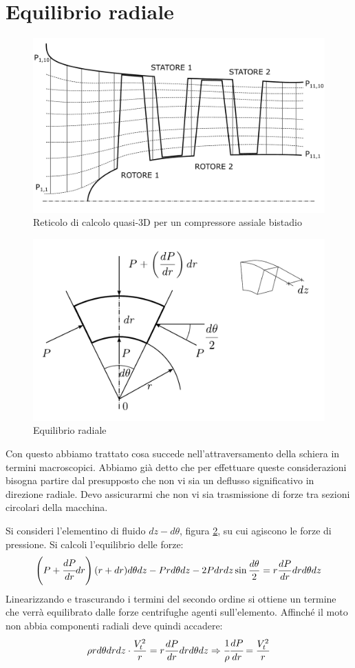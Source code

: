 \section{Equilibrio radiale}
\begin{figure}
\centering
  \includegraphics[width=.8\textwidth]{fig/ReticoloComp.pdf}
\caption{Reticolo di calcolo quasi-3D per un compressore assiale bistadio}
\label{fig:ReticoloComp}
\end{figure}
\begin{figure}
\centering
  \includegraphics[width=.6\textwidth]{fig/concio.pdf}
\caption{Equilibrio radiale}
\label{fig:concio}
\end{figure}
Con questo abbiamo trattato cosa succede nell'attraversamento della schiera in termini macroscopici. Abbiamo già detto che per effettuare queste considerazioni bisogna partire dal presupposto che non vi sia un deflusso significativo in direzione radiale.
Devo assicurarmi che non vi sia trasmissione di forze tra sezioni circolari della macchina.

Si consideri l'elementino di fluido $dz - d\theta$, figura \ref{fig:concio}, su cui agiscono le forze di pressione. 
Si calcoli l'equilibrio delle forze:
\begin{align*}
\left( P + \cfrac{dP}{dr} dr \right) (r + dr) d \theta dz - Pr d \theta dz -2P dr dz \sin \frac{d \theta}{2} = r \frac{dP}{dr} dr d \theta dz
\end{align*}
Linearizzando e trascurando i termini del secondo ordine si ottiene un termine che verrà equilibrato dalle forze centrifughe agenti sull'elemento. Affinché il moto non abbia componenti radiali deve quindi accadere:
\begin{equation}
\rho r d \theta dr dz \cdot \frac{V_t^2}{r} = r \frac{dP}{dr} dr d \theta dz\Rightarrow \cfrac{1}{\rho} \cfrac{dP}{dr} = \frac{V_t^2}{r}
\label{eq:EquilibrioRad}
\end{equation}

